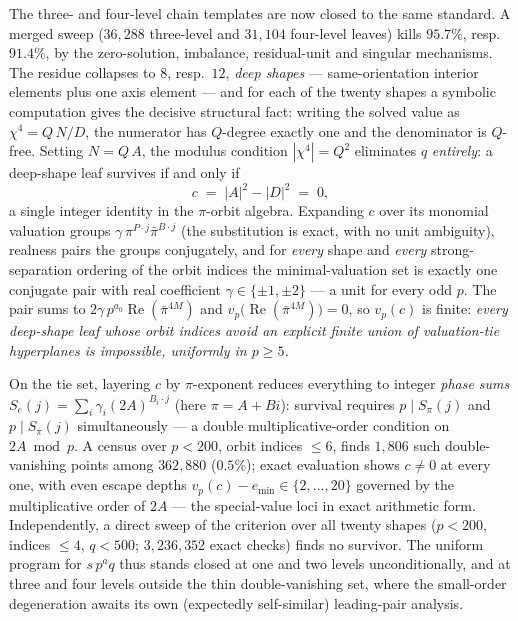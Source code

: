 \documentclass[11pt]{article}
\theoremstyle{remark}
\DeclareMathOperator{\re}{Re}
\begin{document}
The three- and four-level chain templates are now closed to the same
standard.  A merged sweep ($36{,}288$ three-level and $31{,}104$ four-level
leaves) kills $95.7\%$, resp.\ $91.4\%$, by the zero-solution, imbalance,
residual-unit and singular mechanisms.  The residue collapses to $8$,
resp.\ $12$, \emph{deep shapes} --- same-orientation interior elements plus
one axis element --- and for each of the twenty shapes a symbolic
computation gives the decisive structural fact: writing the solved value as
$\chi^4 = Q\,N/D$, the numerator has $Q$-degree exactly one and the
denominator is $Q$-free.  Setting $N = Q\,A$, the modulus condition
$|\chi^4| = Q^2$ eliminates $q$ \emph{entirely}: a deep-shape leaf survives
if and only if
\[
c \;=\; |A|^2 - |D|^2 \;=\; 0,
\]
a single integer identity in the $\pi$-orbit algebra.  Expanding $c$ over
its monomial valuation groups $\gamma\,\pi^{P\cdot j}\bar\pi^{B\cdot j}$
(the substitution is exact, with no unit ambiguity), realness pairs the
groups conjugately, and for \emph{every} shape and \emph{every}
strong-separation ordering of the orbit indices the minimal-valuation set
is exactly one conjugate pair with real coefficient $\gamma\in\{\pm1,\pm2\}$
--- a unit for every odd $p$.  The pair sums to
$2\gamma\,p^{a_0}\re(\bar\pi^{4M})$ and $v_p\!\bigl(\re(\bar\pi^{4M})\bigr)=0$,
so $v_p(c)$ is finite: \emph{every deep-shape leaf whose orbit indices avoid
an explicit finite union of valuation-tie hyperplanes is impossible,
uniformly in $p\ge 5$.}

On the tie set, layering $c$ by $\pi$-exponent reduces everything to
integer \emph{phase sums} $S_e(j)=\sum_i\gamma_i(2A)^{B_i\cdot j}$
(here $\pi = A+Bi$): survival requires $p \mid S_\pi(j)$ and
$p \mid S_{\bar\pi}(j)$ simultaneously --- a double multiplicative-order
condition on $2A \bmod p$.  A census over $p<200$, orbit indices
$\le 6$, finds $1{,}806$ such double-vanishing points among $362{,}880$
($0.5\%$); exact evaluation shows $c\ne 0$ at every one, with even escape
depths $v_p(c)-e_{\min}\in\{2,\dots,20\}$ governed by the multiplicative
order of $2A$ --- the special-value loci in exact arithmetic form.
Independently, a direct sweep of the criterion over all twenty shapes
($p<200$, indices $\le 4$, $q<500$; $3{,}236{,}352$ exact checks) finds no
survivor.  The uniform program for $s\,p^aq$ thus stands closed at one and
two levels unconditionally, and at three and four levels outside the thin
double-vanishing set, where the small-order degeneration awaits its own
(expectedly self-similar) leading-pair analysis.
\end{document}
